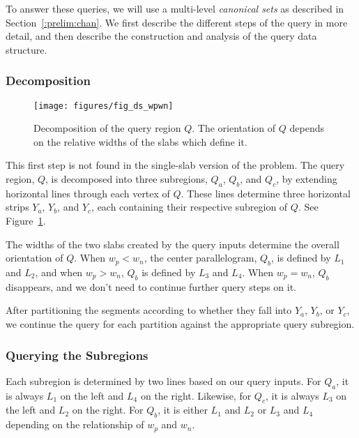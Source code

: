 To answer these queries, we will use a multi-level \emph{canonical sets} as described in Section~\ref{:prelim:chan}. We first describe the different steps of the query in more detail, and then describe the construction and analysis of the query data structure.


\subsubsection{Decomposition}

\begin{figure}
\begin{center}
  \texttt{[image: figures/fig\_ds\_wpwn]}
  \caption[Decomposition of the query region $Q$]{Decomposition of the query region $Q$. The orientation of $Q$ depends on the relative widths of the slabs which define it.}
  \label{fig:slabs:two:wpwn}
\end{center}
\end{figure}

This first step is not found in the single-slab version of the problem. The query region, $Q$, is decomposed into three subregions, $Q_a$, $Q_b$, and $Q_c$, by extending horizontal lines through each vertex of $Q$. These lines determine three horizontal strips $Y_a$, $Y_b$, and $Y_c$, each containing their respective subregion of $Q$. See Figure~\ref{fig:slabs:two:wpwn}.

The widths of the two slabs created by the query inputs determine the overall orientation of $Q$. When $w_p < w_n$, the center parallelogram, $Q_b$, is defined by $L_1$ and $L_2$, and when $w_p > w_n$, $Q_b$ is defined by $L_3$ and $L_4$. When $w_p = w_n$, $Q_b$ disappears, and we don't need to continue further query steps on it.

After partitioning the segments according to whether they fall into $Y_a$, $Y_b$, or $Y_c$, we continue the query for each partition against the appropriate query subregion.


\subsubsection{Querying the Subregions}

Each subregion is determined by two lines based on our query inputs. For $Q_a$, it is always $L_1$ on the left and $L_4$ on the right. Likewise, for $Q_c$, it is always $L_3$ on the left and $L_2$ on the right. For $Q_b$, it is either $L_1$ and $L_2$ or $L_3$ and $L_4$ depending on the relationship of $w_p$ and $w_n$.

